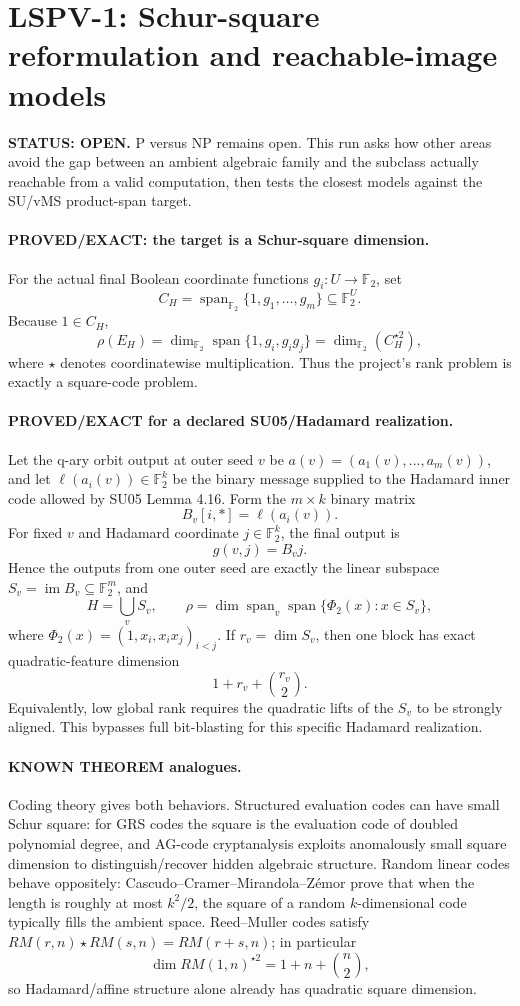 \documentclass[11pt]{article}
\begin{document}
\section*{LSPV-1: Schur-square reformulation and reachable-image models}

\textbf{STATUS: OPEN.} P versus NP remains open. This run asks how other areas avoid the gap between an ambient algebraic family and the subclass actually reachable from a valid computation, then tests the closest models against the SU/vMS product-span target.

\paragraph{PROVED/EXACT: the target is a Schur-square dimension.}
For the actual final Boolean coordinate functions $g_i:U\to\mathbb F_2$, set
\[
C_H=\operatorname{span}_{\mathbb F_2}\{1,g_1,\ldots,g_m\}\subseteq\mathbb F_2^U.
\]
Because $1\in C_H$,
\[
\boxed{\rho(E_H)=
\dim_{\mathbb F_2}\operatorname{span}\{1,g_i,g_ig_j\}
=\dim_{\mathbb F_2}(C_H^{\star2}),}
\]
where $\star$ denotes coordinatewise multiplication. Thus the project's rank problem is exactly a square-code problem.

\paragraph{PROVED/EXACT for a declared SU05/Hadamard realization.}
Let the q-ary orbit output at outer seed $v$ be
$a(v)=(a_1(v),\ldots,a_m(v))$, and let
$\ell(a_i(v))\in\mathbb F_2^k$ be the binary message supplied to the Hadamard inner code allowed by SU05 Lemma 4.16. Form the $m\times k$ binary matrix
\[
B_v[i,*]=\ell(a_i(v)).
\]
For fixed $v$ and Hadamard coordinate $j\in\mathbb F_2^k$, the final output is
\[
g(v,j)=B_vj.
\]
Hence the outputs from one outer seed are exactly the linear subspace
$S_v=\operatorname{im}B_v\subseteq\mathbb F_2^m$, and
\[
H=\bigcup_v S_v,\qquad
\rho=\dim\operatorname{span}_v\operatorname{span}\{\Phi_2(x):x\in S_v\},
\]
where $\Phi_2(x)=(1,x_i,x_ix_j)_{i<j}$. If $r_v=\dim S_v$, then one block has exact quadratic-feature dimension
\[
1+r_v+\binom{r_v}{2}.
\]
Equivalently, low global rank requires the quadratic lifts of the $S_v$ to be strongly aligned. This bypasses full bit-blasting for this specific Hadamard realization.

\paragraph{KNOWN THEOREM analogues.}
Coding theory gives both behaviors. Structured evaluation codes can have small Schur square: for GRS codes the square is the evaluation code of doubled polynomial degree, and AG-code cryptanalysis exploits anomalously small square dimension to distinguish/recover hidden algebraic structure. Random linear codes behave oppositely: Cascudo--Cramer--Mirandola--Z\'emor prove that when the length is roughly at most $k^2/2$, the square of a random $k$-dimensional code typically fills the ambient space. Reed--Muller codes satisfy
$RM(r,n)\star RM(s,n)=RM(r+s,n)$; in particular
\[
\dim RM(1,n)^{\star2}=1+n+\binom n2,
\]
so Hadamard/affine structure alone already has quadratic square dimension.
\end{document}
